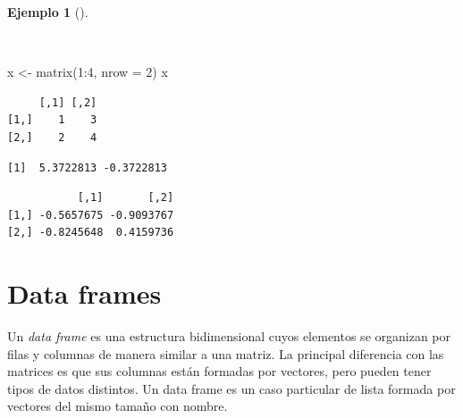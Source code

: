 \documentclass[
  a4paper,
]{scrreport}
\newenvironment{Shaded}{\begin{snugshade}}{\end{snugshade}}
\newcommand{\AttributeTok}[1]{\textcolor[rgb]{0.40,0.45,0.13}{#1}}
\newcommand{\CommentTok}[1]{\textcolor[rgb]{0.37,0.37,0.37}{#1}}
\newcommand{\DecValTok}[1]{\textcolor[rgb]{0.68,0.00,0.00}{#1}}
\newcommand{\FunctionTok}[1]{\textcolor[rgb]{0.28,0.35,0.67}{#1}}
\newcommand{\NormalTok}[1]{\textcolor[rgb]{0.00,0.23,0.31}{#1}}
\newcommand{\OtherTok}[1]{\textcolor[rgb]{0.00,0.23,0.31}{#1}}
\newcommand{\SpecialCharTok}[1]{\textcolor[rgb]{0.37,0.37,0.37}{#1}}
\theoremstyle{definition}
\theoremstyle{definition}
\newtheorem{example}{Ejemplo}[chapter]
\theoremstyle{remark}
\begin{document}
\begin{example}[]\protect\hypertarget{exm-autovalores-autovectores}{}\label{exm-autovalores-autovectores}

~

\begin{Shaded}
\begin{Highlighting}[]
\NormalTok{x }\OtherTok{\textless{}{-}} \FunctionTok{matrix}\NormalTok{(}\DecValTok{1}\SpecialCharTok{:}\DecValTok{4}\NormalTok{, }\AttributeTok{nrow =} \DecValTok{2}\NormalTok{)}
\NormalTok{x}
\end{Highlighting}
\end{Shaded}

\begin{verbatim}
     [,1] [,2]
[1,]    1    3
[2,]    2    4
\end{verbatim}

\begin{Shaded}
\end{Shaded}

\begin{verbatim}
[1]  5.3722813 -0.3722813
\end{verbatim}

\begin{Shaded}
\end{Shaded}

\begin{verbatim}
           [,1]       [,2]
[1,] -0.5657675 -0.9093767
[2,] -0.8245648  0.4159736
\end{verbatim}

\end{example}

\section{Data frames}\label{data-frames}

Un \emph{data frame} es una estructura bidimensional cuyos elementos se
organizan por filas y columnas de manera similar a una matriz. La
principal diferencia con las matrices es que sus columnas están formadas
por vectores, pero pueden tener tipos de datos distintos. Un data frame
es un caso particular de lista formada por vectores del mismo tamaño con
nombre.
\end{document}

